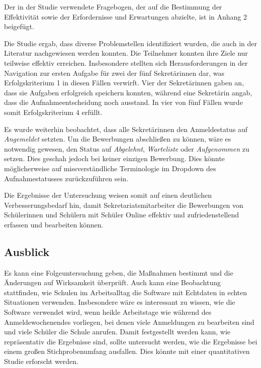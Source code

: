Der in der Studie verwendete Fragebogen, der auf die Bestimmung der Effektivität sowie der Erfordernisse und Erwartungen abzielte, ist in Anhang 2 beigefügt.

Die Studie ergab, dass diverse Problemstellen identifiziert wurden, die auch in der Literatur nachgewiesen werden konnten. Die Teilnehmer konnten ihre Ziele nur teilweise effektiv erreichen. Insbesondere stellten sich Herausforderungen in der Navigation zur ersten Aufgabe für zwei der fünf Sekretärinnen dar, was Erfolgskriterium 1 in diesen Fällen verwirft. Vier der Sekretärinnen gaben an, dass sie Aufgaben erfolgreich speichern konnten, während eine Sekretärin angab, dass die Aufnahmeentscheidung noch ausstand. In vier von fünf Fällen wurde somit Erfolgskriterium 4 erfüllt.

Es wurde weiterhin beobachtet, dass alle Sekretärinnen den Anmeldestatus auf \textit{Angemeldet} setzten. Um die Bewerbungen abschließen zu können, wäre es notwendig gewesen, den Status auf \textit{Abgelehnt}, \textit{Warteliste} oder \textit{Aufgenommen} zu setzen. Dies geschah jedoch bei keiner einzigen Bewerbung. Dies könnte möglicherweise auf missverständliche Terminologie im Dropdown des Aufnahmestatusses zurückzuführen sein.

Die Ergebnisse der Untersuchung weisen somit auf einen deutlichen Verbesserungsbedarf hin, damit Sekretariatsmitarbeiter die Bewerbungen von Schülerinnen und Schülern mit Schüler Online effektiv und zufriedenstellend erfassen und bearbeiten können.

\subsection{Ausblick}
Es kann eine Folgeuntersuchung geben, die Maßnahmen bestimmt und die Änderungen auf Wirksamkeit überprüft.
Auch kann eine Beobachtung stattfinden, wie Schulen im Arbeitsalltag die Software mit Echtdaten in echten Situationen verwenden. Insbesondere wäre es interessant zu wissen, wie die Software verwendet wird, wenn heikle Arbeitstage wie während des Anmeldewochenendes vorliegen, bei denen viele Anmeldungen zu bearbeiten sind und viele Schüler die Schule anrufen.
Damit festgestellt werden kann, wie repräsentativ die Ergebnisse sind, sollte untersucht werden, wie die Ergebnisse bei einem großen Stichprobenumfang ausfallen. Dies könnte mit einer quantitativen Studie erforscht werden.
